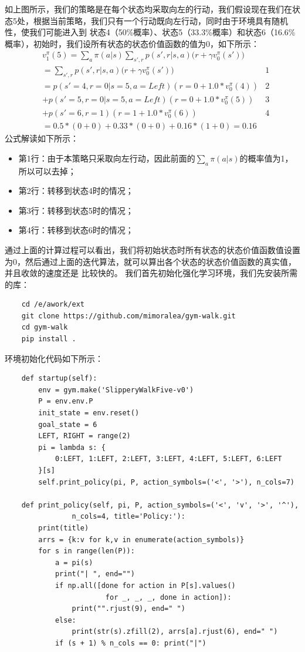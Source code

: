 如上图所示，我们的策略是在每个状态均采取向左的行动，我们假设现在我们在状态5处，根据当前策略，我们只有一个行动既向左行动，同时由于环境具有随机性，使我们可能进入到
状态4（50\%概率）、状态5（33.3\%概率）和状态6（16.6\%概率），初始时，我们设所有状态的状态价值函数的值为0，如下所示：
\begin{equation}
\begin{aligned}
& v_{1}^{\pi}(5) = \sum_{a} \pi (a | s) \sum_{s', r} p(s', r | s, a) \bigg( r + \gamma v_{0}^{\pi}(s') \bigg) \\
& =\sum_{s', r} p(s', r | s, a) \bigg( r + \gamma v_{0}^{\pi}(s') \bigg) & 1  \\
& = p(s'=4, r=0 | s=5, a=Left) (r=0 + 1.0 * v_{0}^{\pi}(4)) & 2 \\
& + p(s'=5, r=0 | s=5, a=Left)(r=0 + 1.0*v_{0}^{\pi}(5)) & 3\\
& + p(s'=6, r=1)(r=1 + 1.0*v_{0}^{\pi}(6)) & 4 \\
& = 0.5*(0 + 0) + 0.33*(0+0) + 0.16*(1+0) = 0.16
\end{aligned}
\label{a-v-f-p-e-swf-demo}
\end{equation}
公式解读如下所示：
\begin{itemize}
    \item 第1行：由于本策略只采取向左行动，因此前面的$\sum_{a}\pi(a | s)$的概率值为1，所以可以去掉；
    \item 第2行：转移到状态4时的情况；
    \item 第3行：转移到状态5时的情况；
    \item 第4行：转移到状态6时的情况；
\end{itemize}
通过上面的计算过程可以看出，我们将初始状态时所有状态的状态价值函数值设置为0，然后通过上面的迭代算法，就可以算出各个状态的状态价值函数的真实值，并且收敛的速度还是
比较快的。
我们首先初始化强化学习环境，我们先安装所需的库：
\begin{lstlisting}
    cd /e/awork/ext
    git clone https://github.com/mimoralea/gym-walk.git
    cd gym-walk
    pip install .
\end{lstlisting}
环境初始化代码如下所示：
\begin{lstlisting}
    def startup(self):
        env = gym.make('SlipperyWalkFive-v0')
        P = env.env.P
        init_state = env.reset()
        goal_state = 6
        LEFT, RIGHT = range(2)
        pi = lambda s: {
            0:LEFT, 1:LEFT, 2:LEFT, 3:LEFT, 4:LEFT, 5:LEFT, 6:LEFT
        }[s]
        self.print_policy(pi, P, action_symbols=('<', '>'), n_cols=7)

    def print_policy(self, pi, P, action_symbols=('<', 'v', '>', '^'), 
                n_cols=4, title='Policy:'):
        print(title)
        arrs = {k:v for k,v in enumerate(action_symbols)}
        for s in range(len(P)):
            a = pi(s)
            print("| ", end="")
            if np.all([done for action in P[s].values() 
                        for _, _, _, done in action]):
                print("".rjust(9), end=" ")
            else:
                print(str(s).zfill(2), arrs[a].rjust(6), end=" ")
            if (s + 1) % n_cols == 0: print("|")
\end{lstlisting}
